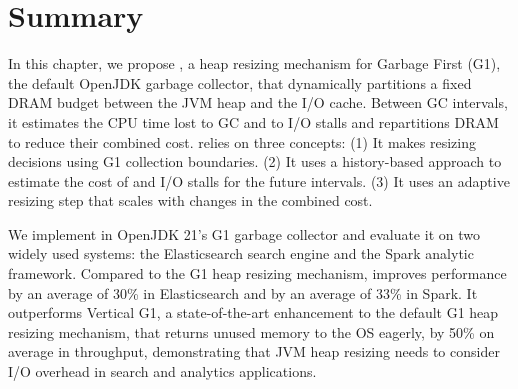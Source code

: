 \section{Summary}
In this chapter, we propose \flexheapName{}, a heap resizing mechanism for Garbage First (G1), the default OpenJDK garbage collector, that dynamically partitions a fixed DRAM budget between the JVM heap and the I/O cache.
Between GC intervals, it estimates the CPU time lost to GC and to I/O stalls and repartitions DRAM to reduce their combined cost.
\flexheapName{} relies on three concepts:
%
(1) It makes resizing decisions using G1 collection boundaries.
%
(2) It uses a history-based approach to estimate the cost of \flexheapGC{} and I/O stalls for the future intervals.
%
(3) It uses an adaptive resizing step that scales with changes in the combined cost.

We implement \flexheapName{} in OpenJDK 21’s G1 garbage collector and evaluate it on two widely used systems: the Elasticsearch search engine and the Spark analytic framework.
Compared to the G1 heap resizing mechanism, \flexheapName{} improves performance by an average of 30\% in Elasticsearch and by an average of 33\% in Spark.
It outperforms Vertical G1, a state-of-the-art enhancement to the default G1 heap resizing mechanism, that returns unused memory to the OS eagerly, by 50\% on average in throughput, demonstrating that JVM heap resizing needs to consider I/O overhead in search and analytics applications.
